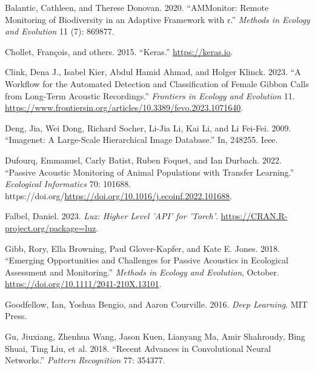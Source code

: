\documentclass[fleqn,10pt,lineno]{wlpeerj} %
\newlength{\cslhangindent}
\newlength{\cslentryspacingunit} %
\newenvironment{CSLReferences}[2] %
 {%
  \setlength{\parindent}{0pt}
  \ifodd #1
  \let\oldpar\par
  \def\par{\hangindent=\cslhangindent\oldpar}
  \fi
  \setlength{\parskip}{#2\cslentryspacingunit}
 }%
 {}
\begin{document}
\hypertarget{refs}{}
\begin{CSLReferences}{1}{0}
\leavevmode{}%
Balantic, Cathleen, and Therese Donovan. 2020. {``AMMonitor: Remote
Monitoring of Biodiversity in an Adaptive Framework with r.''}
\emph{Methods in Ecology and Evolution} 11 (7): 869877.

\leavevmode{}%
Chollet, François, and others. 2015. {``Keras.''}
\url{https://keras.io}.

\leavevmode{}%
Clink, Dena J., Isabel Kier, Abdul Hamid Ahmad, and Holger Klinck. 2023.
{``A Workflow for the Automated Detection and Classification of Female
Gibbon Calls from Long-Term Acoustic Recordings.''} \emph{Frontiers in
Ecology and Evolution} 11.
\url{https://www.frontiersin.org/articles/10.3389/fevo.2023.1071640}.

\leavevmode{}%
Deng, Jia, Wei Dong, Richard Socher, Li-Jia Li, Kai Li, and Li Fei-Fei.
2009. {``Imagenet: A Large-Scale Hierarchical Image Database.''} In,
248255. Ieee.

\leavevmode{}%
Dufourq, Emmanuel, Carly Batist, Ruben Foquet, and Ian Durbach. 2022.
{``Passive Acoustic Monitoring of Animal Populations with Transfer
Learning.''} \emph{Ecological Informatics} 70: 101688.
https://doi.org/\url{https://doi.org/10.1016/j.ecoinf.2022.101688}.

\leavevmode{}%
Falbel, Daniel. 2023. \emph{Luz: Higher Level 'API' for 'Torch'}.
\url{https://CRAN.R-project.org/package=luz}.

\leavevmode{}%
Gibb, Rory, Ella Browning, Paul Glover-Kapfer, and Kate E. Jones. 2018.
{``Emerging Opportunities and Challenges for Passive Acoustics in
Ecological Assessment and Monitoring.''} \emph{Methods in Ecology and
Evolution}, October. \url{https://doi.org/10.1111/2041-210X.13101}.

\leavevmode{}%
Goodfellow, Ian, Yoshua Bengio, and Aaron Courville. 2016. \emph{Deep
Learning}. MIT Press.

\leavevmode{}%
Gu, Jiuxiang, Zhenhua Wang, Jason Kuen, Lianyang Ma, Amir Shahroudy,
Bing Shuai, Ting Liu, et al. 2018. {``Recent Advances in Convolutional
Neural Networks.''} \emph{Pattern Recognition} 77: 354377.


\end{CSLReferences}
\end{document}
